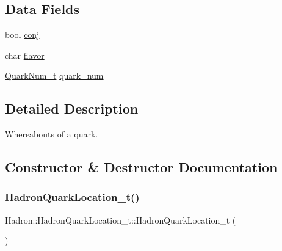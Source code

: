\subsection*{Data Fields}
\begin{DoxyCompactItemize}
\item 
bool \mbox{\hyperlink{structHadron_1_1HadronQuarkLocation__t_a4fd64b1ec0731ff1017e9573768e1456}{conj}}
\item 
char \mbox{\hyperlink{structHadron_1_1HadronQuarkLocation__t_a31beaaffd8b2dec8d57b7020673e4e3d}{flavor}}
\item 
\mbox{\hyperlink{structHadron_1_1QuarkNum__t}{Quark\+Num\+\_\+t}} \mbox{\hyperlink{structHadron_1_1HadronQuarkLocation__t_ad4abb30a9e5f991c0eeeb4869457f8b6}{quark\+\_\+num}}
\end{DoxyCompactItemize}


\subsection{Detailed Description}
Whereabouts of a quark. 

\subsection{Constructor \& Destructor Documentation}
\mbox{\label{structHadron_1_1HadronQuarkLocation__t_a134386bb80be45cf0767a6c45e3b6f52}} 
\subsubsection{\texorpdfstring{HadronQuarkLocation\_t()}{HadronQuarkLocation\_t()}\hspace{0.1cm}{\footnotesize\ttfamily [1/6]}}
{\footnotesize\ttfamily Hadron\+::\+Hadron\+Quark\+Location\+\_\+t\+::\+Hadron\+Quark\+Location\+\_\+t (\begin{DoxyParamCaption}{ }\end{DoxyParamCaption})\hspace{0.3cm}{\ttfamily [inline]}}

\mbox{\label{structHadron_1_1HadronQuarkLocation__t_a214dddf7650dc22b5c424715fc27dd42}} 
